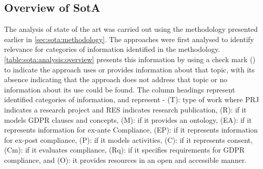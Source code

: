 \subsection{Overview of SotA}
The analysis of state of the art was carried out using the methodology presented earlier in \autoref{sec:sota:methodology}.
The approaches were first analysed to identify relevance for categories of information identified in the methodology.
\autoref{table:sota:analysis:overview} presents this information by using a check mark (\cmark) to indicate the approach uses or provides information about that topic, with its absence indicating that the approach does not address that topic or no information about its use could be found.
The column headings represent identified categories of information, and represent - (T): type of work where PRJ indicates a research project and RES indicates research publication, (R): if it models GDPR clauses and concepts, (M): if it provides an ontology, (EA): if it represents information for ex-ante Compliance, (EP): if it represents information for ex-post compliance, (P): if it models activities, (C): if it represents consent, (Cm): if it evaluates compliance, (Rq): if it specifies requirements for GDPR compliance, and (O): it provides resources in an open and accessible manner.
